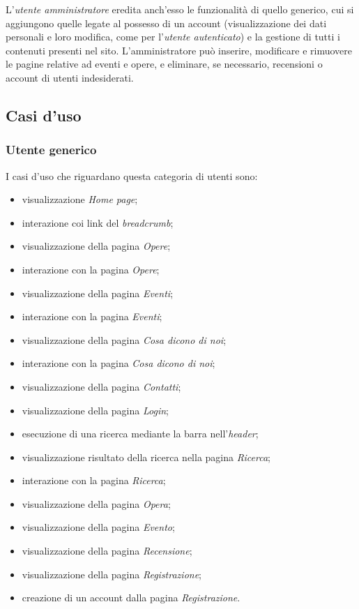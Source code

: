 L'\textit{utente amministratore} eredita anch'esso le funzionalità di quello generico, cui si aggiungono quelle legate al possesso di un account (visualizzazione dei dati personali e loro modifica, come per l'\textit{utente autenticato}) e  la gestione di tutti i contenuti presenti nel sito. L'amministratore può inserire, modificare e rimuovere le pagine relative ad eventi e opere, e eliminare, se necessario, recensioni o account di utenti indesiderati.


\subsection{Casi d'uso}
\label{analisi-casi-uso}

\subsubsection{Utente generico}
\label{analisi-casi-uso-attori-principali-utente-generico}
I casi d'uso che riguardano questa categoria di utenti sono:
\begin{itemize}
	\item visualizzazione \textit{Home page};
	\item interazione coi link del \textit{breadcrumb};
	\item visualizzazione della pagina \textit{Opere};
	\item interazione con la pagina \textit{Opere};
	\item visualizzazione della pagina \textit{Eventi};
	\item interazione con la pagina \textit{Eventi};
	\item visualizzazione della pagina \textit{Cosa dicono di noi};
	\item interazione con la pagina \textit{Cosa dicono di noi};
	\item visualizzazione della pagina \textit{Contatti};
	\item visualizzazione della pagina \textit{Login};
	\item esecuzione di una ricerca mediante la barra nell'\textit{header};
	\item visualizzazione risultato della ricerca nella pagina \textit{Ricerca};
	\item interazione con la pagina \textit{Ricerca};
	\item visualizzazione della pagina \textit{Opera};
	\item visualizzazione della pagina \textit{Evento};
	\item visualizzazione della pagina \textit{Recensione};
	\item visualizzazione della pagina \textit{Registrazione};
	\item creazione di un account dalla pagina \textit{Registrazione}.
\end{itemize}

